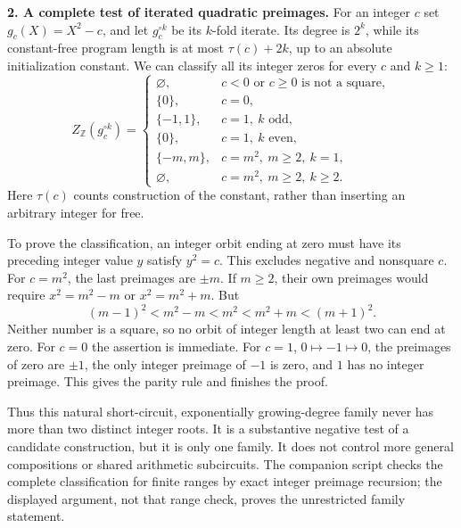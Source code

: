 \documentclass[11pt,a4paper]{article}
\newcommand{\Z}{\mathbb{Z}}
\numberwithin{equation}{section}
\begin{document}
\textbf{2. A complete test of iterated quadratic preimages.}
For an integer $c$ set $g_c(X)=X^2-c$, and let $g_c^{\circ k}$ be its
$k$-fold iterate. Its degree is $2^k$, while its constant-free program
length is at most $\tau(c)+2k$, up to an absolute initialization constant.
We can classify all its integer zeros for every $c$ and $k\ge1$:
\begin{equation}\label{224:iterate}
 Z_{\Z}(g_c^{\circ k})=
 \begin{cases}
 \varnothing,&c<0\text{ or }c\ge0\text{ is not a square},\\
 \{0\},&c=0,\\
 \{-1,1\},&c=1,\ k\text{ odd},\\
 \{0\},&c=1,\ k\text{ even},\\
 \{-m,m\},&c=m^2,\ m\ge2,\ k=1,\\
 \varnothing,&c=m^2,\ m\ge2,\ k\ge2.
 \end{cases}
\end{equation}
Here $\tau(c)$ counts construction of the constant, rather than inserting
an arbitrary integer for free.

To prove the classification, an integer orbit ending at zero must have
its preceding integer value $y$ satisfy $y^2=c$. This excludes negative
and nonsquare $c$. For $c=m^2$, the last preimages are $\pm m$.
If $m\ge2$, their own preimages would require
$x^2=m^2-m$ or $x^2=m^2+m$. But
\[
 (m-1)^2<m^2-m<m^2<m^2+m<(m+1)^2.
\]
Neither number is a square, so no orbit of integer length at least two
can end at zero. For $c=0$ the assertion is immediate. For $c=1$,
$0\mapsto-1\mapsto0$, the preimages of zero are $\pm1$, the only
integer preimage of $-1$ is zero, and $1$ has no integer preimage.
This gives the parity rule and finishes the proof.

Thus this natural short-circuit, exponentially growing-degree family
never has more than two distinct integer roots. It is a substantive
negative test of a candidate construction, but it is only one family.
It does not control more general compositions or shared arithmetic
subcircuits. The companion script checks the complete classification
for finite ranges by exact integer preimage recursion; the displayed
argument, not that range check, proves the unrestricted family statement.
\end{document}
